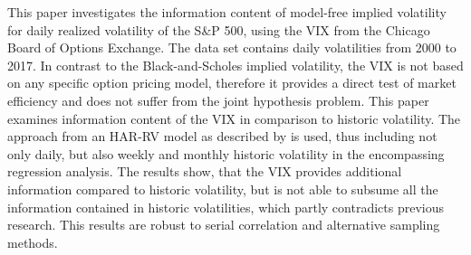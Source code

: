 
This paper investigates the information content of model-free implied volatility for daily realized volatility of the S\&P 500, using the \ac{VIX} from the Chicago Board of Options Exchange. The data set contains daily volatilities from 2000 to 2017. In contrast to the Black-and-Scholes implied volatility, the VIX is not based on any specific option pricing model, therefore it provides a direct test of market efficiency and does not suffer from the joint hypothesis problem. This paper examines information content of the VIX in comparison to historic volatility. The approach from an HAR-RV model as described by \textcite{corsi2009} is used, thus including not only daily, but also weekly and monthly historic volatility in the encompassing regression analysis. The results show, that the VIX provides additional information compared to historic volatility, but is not able to subsume all the information contained in historic volatilities, which partly contradicts previous research. This results are robust to serial correlation and alternative sampling methods. 